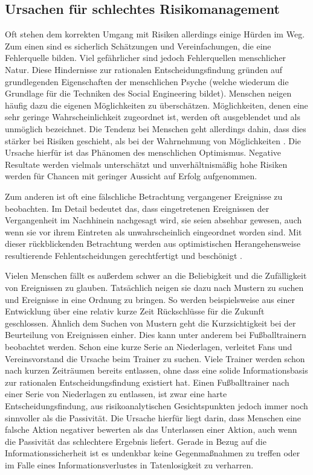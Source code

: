 \subsection{Ursachen für schlechtes Risikomanagement}\label{sec:ursachen}
Oft stehen dem korrekten Umgang mit Risiken allerdings einige Hürden im Weg.
Zum einen sind es sicherlich Schätzungen und Vereinfachungen, die eine Fehlerquelle bilden.
Viel gefährlicher sind jedoch Fehlerquellen menschlicher Natur.
Diese Hindernisse zur rationalen Entscheidungsfindung gründen auf grundlegenden Eigenschaften der menschlichen Psyche (welche wiederum die Grundlage für die Techniken des Social Engineering bildet).
Menschen neigen häufig dazu die eigenen Möglichkeiten zu überschätzen.
Möglichkeiten, denen eine sehr geringe Wahrscheinlichkeit zugeordnet ist, werden oft ausgeblendet und
als unmöglich bezeichnet.
Die Tendenz bei Menschen geht allerdings dahin, dass dies stärker bei Risiken geschieht, als bei der
Wahrnehmung von Möglichkeiten \citep{risikomanagement}.
Die Ursache hierfür ist das Phänomen des menschlichen Optimismus.
Negative Resultate werden vielmals unterschätzt und unverhältnismäßig hohe Risiken werden für Chancen
mit geringer Aussicht auf Erfolg aufgenommen.

Zum anderen ist oft eine fälschliche Betrachtung vergangener Ereignisse zu beobachten.
Im Detail bedeutet das, dass eingetretenen Ereignissen der Vergangenheit im Nachhinein nachgesagt
wird, sie seien absehbar gewesen, auch wenn sie vor ihrem Eintreten als unwahrscheinlich eingeordnet
worden sind.
Mit dieser rückblickenden Betrachtung werden aus optimistischen Herangehensweise resultierende
Fehlentscheidungen gerechtfertigt und beschönigt \citep{risikomanagement}.

Vielen Menschen fällt es außerdem schwer an die Beliebigkeit und die Zufälligkeit von Ereignissen zu
glauben.
Tatsächlich neigen sie dazu nach Mustern zu suchen und Ereignisse in eine Ordnung zu bringen.
So werden beispielsweise aus einer Entwicklung über eine relativ kurze Zeit Rückschlüsse für die Zukunft geschlossen.
Ähnlich dem Suchen von Mustern geht die Kurzsichtigkeit bei der Beurteilung von Ereignissen einher.
Dies kann unter anderem bei Fußballtrainern beobachtet werden.
Schon eine kurze Serie an Niederlagen, verleitet Fans und Vereinsvorstand die Ursache beim Trainer zu
suchen.
Viele Trainer werden schon nach kurzen Zeiträumen bereits entlassen, ohne dass eine solide
Informationsbasis zur rationalen Entscheidungsfindung existiert hat.
Einen Fußballtrainer nach einer Serie von Niederlagen zu entlassen, ist zwar eine harte
Entscheidungsfindung, aus risikoanalytischen Gesichtspunkten jedoch immer noch sinnvoller als die
Passivität.
Die Ursache hierfür liegt darin, dass Menschen eine falsche Aktion negativer bewerten als das
Unterlassen einer Aktion, auch wenn die Passivität das schlechtere Ergebnis liefert.
Gerade in Bezug auf die Informationssicherheit ist es undenkbar keine Gegenmaßnahmen zu treffen oder
im Falle eines Informationsverlustes in Tatenlosigkeit zu verharren.

